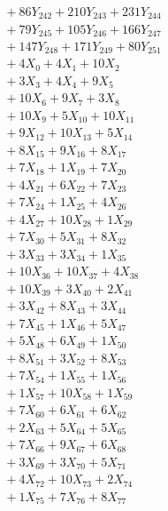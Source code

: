 \documentclass[a4paper,10pt]{article}
\begin{document}
{\begin{align}
&\;  + 86 Y_{242} + 210 Y_{243} + 231 Y_{244} \\[0.3ex]
&\;  + 79 Y_{245} + 105 Y_{246} + 166 Y_{247} \\[0.3ex]
&\;  + 147 Y_{248} + 171 Y_{249} + 80 Y_{251} \\[0.3ex]
&\;  + 4 X_{0} + 4 X_{1} + 10 X_{2} \\[0.3ex]
&\;  + 3 X_{3} + 4 X_{4} + 9 X_{5} \\[0.3ex]
&\;  + 10 X_{6} + 9 X_{7} + 3 X_{8} \\[0.3ex]
&\;  + 10 X_{9} + 5 X_{10} + 10 X_{11} \\[0.3ex]
&\;  + 9 X_{12} + 10 X_{13} + 5 X_{14} \\[0.3ex]
&\;  + 8 X_{15} + 9 X_{16} + 8 X_{17} \\[0.5ex]\allowbreak
&\;  + 7 X_{18} + 1 X_{19} + 7 X_{20} \\[0.3ex]
&\;  + 4 X_{21} + 6 X_{22} + 7 X_{23} \\[0.3ex]
&\;  + 7 X_{24} + 1 X_{25} + 4 X_{26} \\[0.3ex]
&\;  + 4 X_{27} + 10 X_{28} + 1 X_{29} \\[0.3ex]
&\;  + 7 X_{30} + 5 X_{31} + 8 X_{32} \\[0.3ex]
&\;  + 3 X_{33} + 3 X_{34} + 1 X_{35} \\[0.3ex]
&\;  + 10 X_{36} + 10 X_{37} + 4 X_{38} \\[0.3ex]
&\;  + 10 X_{39} + 3 X_{40} + 2 X_{41} \\[0.3ex]
&\;  + 3 X_{42} + 8 X_{43} + 3 X_{44} \\[0.3ex]
&\;  + 7 X_{45} + 1 X_{46} + 5 X_{47} \\[0.5ex]\allowbreak
&\;  + 5 X_{48} + 6 X_{49} + 1 X_{50} \\[0.3ex]
&\;  + 8 X_{51} + 3 X_{52} + 8 X_{53} \\[0.3ex]
&\;  + 7 X_{54} + 1 X_{55} + 1 X_{56} \\[0.3ex]
&\;  + 1 X_{57} + 10 X_{58} + 1 X_{59} \\[0.3ex]
&\;  + 7 X_{60} + 6 X_{61} + 6 X_{62} \\[0.3ex]
&\;  + 2 X_{63} + 5 X_{64} + 5 X_{65} \\[0.3ex]
&\;  + 7 X_{66} + 9 X_{67} + 6 X_{68} \\[0.3ex]
&\;  + 3 X_{69} + 3 X_{70} + 5 X_{71} \\[0.3ex]
&\;  + 4 X_{72} + 10 X_{73} + 2 X_{74} \\[0.3ex]
&\;  + 1 X_{75} + 7 X_{76} + 8 X_{77} \\[0.5ex]\allowbreak

\end{align}}
\end{document}
